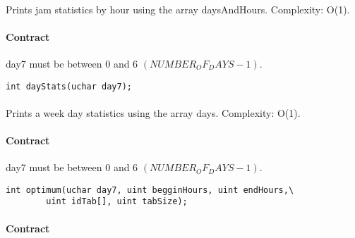 \documentclass[a4paper, 12pts]{article}
\begin{document}
\paragraph{}
	Prints jam statistics by hour using the array daysAndHours. Complexity: O(1).
\paragraph{Contract}
	day7 must be between 0 and 6 $(NUMBER_OF_DAYS-1)$.

\begin{lstlisting}
int dayStats(uchar day7);
\end{lstlisting}
\paragraph{}
	Prints a week day statistics using the array days. Complexity: O(1).
\paragraph{Contract}
	day7 must be between 0 and 6 $(NUMBER_OF_DAYS-1)$.
	
\begin{lstlisting}
int optimum(uchar day7, uint begginHours, uint endHours,\
		uint idTab[], uint tabSize);
\end{lstlisting}
\paragraph{}
	
\paragraph{Contract}
\end{document}
